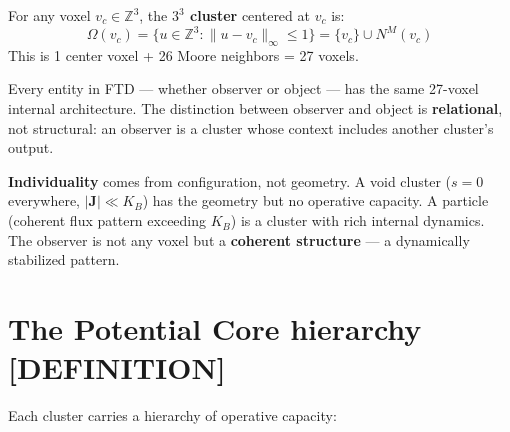 \documentclass[
  11pt,
  letterpaper,
  twoside,
  openany]{book}
\makeatletter
\let\orig@section\section
\renewcommand{\section}{\needspace{8\baselineskip}\orig@section}
\makeatother
\begin{document}
\begin{ftddefinition}

For any voxel \(v_c \in \mathbb{Z}^3\), the \textbf{\(3^3\) cluster}
centered at \(v_c\) is: \[
\Omega(v_c) = \{ u \in \mathbb{Z}^3 : \|u - v_c\|_\infty \leq 1 \} = \{v_c\} \cup N^M(v_c)
\] This is 1 center voxel + 26 Moore neighbors = 27 voxels.

\end{ftddefinition}

Every entity in FTD --- whether observer or object --- has the same
27-voxel internal architecture. The distinction between observer and
object is \textbf{relational}, not structural: an observer is a cluster
whose context includes another cluster's output.

\textbf{Individuality} comes from configuration, not geometry. A void
cluster (\(s = 0\) everywhere, \(|\mathbf{J}| \ll K_B\)) has the
geometry but no operative capacity. A particle (coherent flux pattern
exceeding \(K_B\)) is a cluster with rich internal dynamics. The
observer is not any voxel but a \textbf{coherent structure} --- a
dynamically stabilized pattern.

\section{The Potential Core hierarchy
{[}DEFINITION{]}}\label{the-potential-core-hierarchy-definition}

Each cluster carries a hierarchy of operative capacity:
\end{document}
